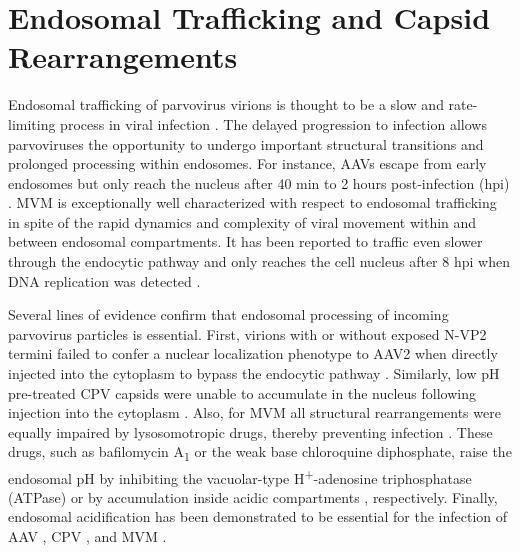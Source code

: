 \section{Endosomal Trafficking and Capsid Rearrangements}
\label{Rearrangements}
Endosomal trafficking of parvovirus virions is thought to be a slow and rate-limiting process in viral infection \cite{pmid10841516, pmid10623762, pmid11287557, pmid16379002}. The delayed progression to infection allows parvoviruses the opportunity to undergo important structural transitions and prolonged processing within endosomes. For instance, AAVs escape from early endosomes but only reach the nucleus after 40 min to 2 hours post-infection (hpi) \cite{pmid10684294, pmid12388712}. MVM is exceptionally well characterized with respect to endosomal trafficking in spite of the rapid dynamics and complexity of viral movement within and between endosomal compartments. It has been reported to traffic even slower through the endocytic pathway and only reaches the cell nucleus after 8 hpi when DNA replication was detected \cite{pmid12438589}.       

Several lines of evidence confirm that endosomal processing of incoming parvovirus particles is essential. First, virions with or without exposed N-VP2 termini failed to confer a nuclear localization phenotype to AAV2 when directly injected into the cytoplasm to bypass the endocytic pathway \cite{pmid16956943, pmid15829993}. Similarly, low pH pre-treated CPV capsids were unable to accumulate in the nucleus following injection into the cytoplasm \cite{pmid9420290}. Also, for MVM all structural rearrangements were equally impaired by lysosomotropic drugs, thereby preventing infection \cite{pmid16379002, pmid12438589}. These drugs, such as bafilomycin A\textsubscript{1} or the weak base chloroquine diphosphate, raise the endosomal pH by inhibiting the vacuolar-type H\textsuperscript{+}-adenosine triphosphatase (ATPase) \cite{pmid2973058, pmid6094416, BafA1} or by accumulation inside acidic compartments \cite{pmid4606365, pmid28524, pmid6169733}, respectively. Finally, endosomal acidification has been demonstrated to be essential for the infection of AAV \cite{pmid10684294, pmid15681453, pmid11160681, pmid11287557}, CPV \cite{pmid10644365, pmid9420290, pmid1733094}, and MVM \cite{pmid16379002, pmid12438589}.  


